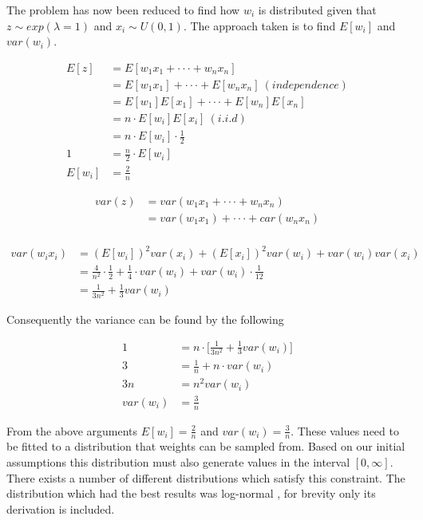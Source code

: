 The problem has now been reduced to find how $w_i$ is distributed given that $z \sim exp(\lambda = 1)$ and $x_i \sim U(0,1)$. The approach taken is to find $E[w_i]$ and $var(w_i)$.

\begin{align*}
E[z] &= E[w_1x_1 + \cdot \cdot \cdot + w_nx_n]\\
&= E[w_1x_1] + \cdot \cdot \cdot + E[w_nx_n]\ (independence)\\
&= E[w_1]E[x_1] + \cdot \cdot \cdot + E[w_n]E[x_n]\\
&= n \cdot E[w_i]E[x_i]\ (i.i.d)\\
&= n \cdot E[w_i] \cdot \frac{1}{2}\\
1 &= \frac{n}{2} \cdot E[w_i]\\
E[w_i] &= \frac{2}{n}
\end{align*}

\begin{align*}
var(z) &= var(w_1x_1 + \cdot \cdot \cdot + w_nx_n)\\
&= var(w_1x_1) + \cdot \cdot \cdot + car(w_nx_n)\\
\end{align*}

\begin{align*}
var(w_ix_i) &= (E[w_i])^2var(x_i) + (E[x_i])^2var(w_i) + var(w_i)var(x_i)\\
&= \frac{4}{n^2} \cdot \frac{1}{2} + \frac{1}{4} \cdot var(w_i) + var(w_i) \cdot \frac{1}{12}\\
&= \frac{1}{3 n^2} + \frac{1}{3}var(w_i)
\end{align*}

Consequently the variance can be found by the following

\begin{align*}
1 &= n \cdot \big[\frac{1}{3 n^2} + \frac{1}{3}var(w_i)\big]\\
3 &= \frac{1}{n} + n \cdot var(w_i)\\
3n &= n^2 var(w_i)\\
var(w_i) &= \frac{3}{n}
\end{align*}

From the above arguments $E[w_i] = \frac{2}{n}$ and $var(w_i) = \frac{3}{n}$. These values need to be fitted to a distribution that weights can be sampled from. Based on our initial assumptions this distribution must also generate values in the interval $[0, \infty]$. There exists a number of different distributions which satisfy this constraint. The distribution which had the best results was log-normal \cite{balakrishnan2006continuous}, for brevity only its derivation is included.

